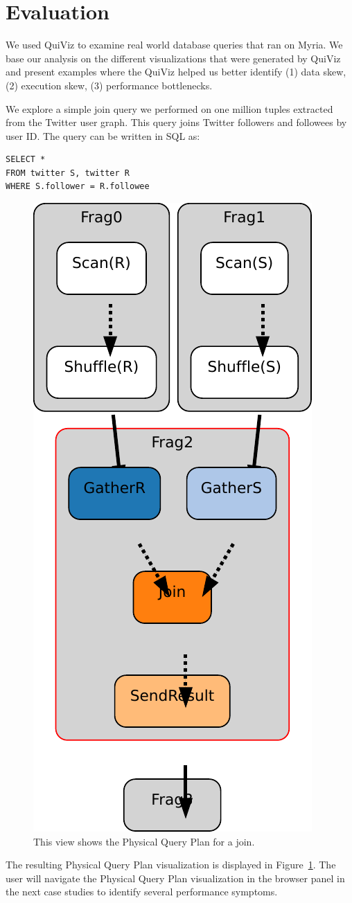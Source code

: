 \documentclass{chi2009}
\newcommand*{\system}{QuiViz\xspace}
\newcommand*{\graph}{Physical Query Plan\xspace}
\begin{document}
\section{Evaluation}
\label{sec:eval}

We used \system to examine real world database queries that ran on Myria. We base our analysis on the different visualizations that were generated by \system and present examples where the \system helped us better identify (1) data skew, (2) execution skew, (3) performance bottlenecks.

We explore a simple join query we performed on one million tuples extracted from the Twitter user graph. This query joins Twitter followers and followees by user ID. The query can be written in SQL as:

\begin{lstlisting}
SELECT *
FROM twitter S, twitter R
WHERE S.follower = R.followee
\end{lstlisting}


\begin{figure}[ht]
  \centering
  \includegraphics[width=0.4\columnwidth]{images/graph_join}
  \caption{This view shows the \graph for a join.}
  \label{fig:join}
\end{figure}


The resulting \graph visualization is displayed in Figure~\ref{fig:join}. The user will navigate the \graph visualization in the browser panel in the next case studies to identify several performance symptoms.
\end{document}
